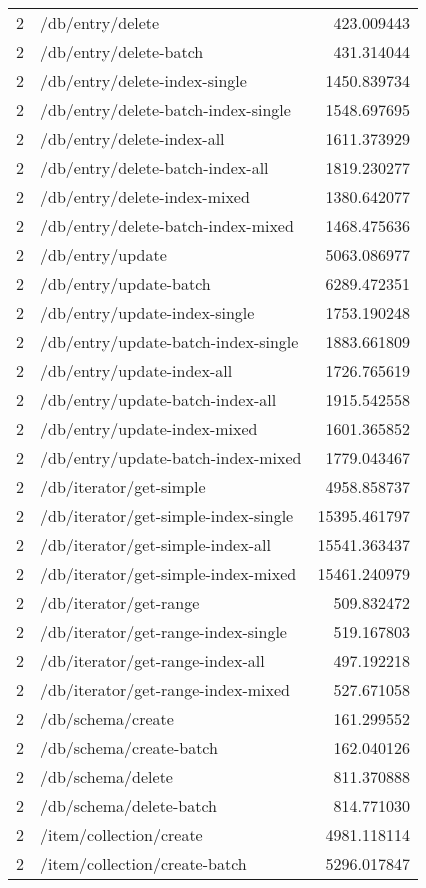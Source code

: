 \begin{longtable}{rlr}
2 & /db/entry/delete & 423.009443 \\
2 & /db/entry/delete-batch & 431.314044 \\
2 & /db/entry/delete-index-single & 1450.839734 \\
2 & /db/entry/delete-batch-index-single & 1548.697695 \\
2 & /db/entry/delete-index-all & 1611.373929 \\
2 & /db/entry/delete-batch-index-all & 1819.230277 \\
2 & /db/entry/delete-index-mixed & 1380.642077 \\
2 & /db/entry/delete-batch-index-mixed & 1468.475636 \\
2 & /db/entry/update & 5063.086977 \\
2 & /db/entry/update-batch & 6289.472351 \\
2 & /db/entry/update-index-single & 1753.190248 \\
2 & /db/entry/update-batch-index-single & 1883.661809 \\
2 & /db/entry/update-index-all & 1726.765619 \\
2 & /db/entry/update-batch-index-all & 1915.542558 \\
2 & /db/entry/update-index-mixed & 1601.365852 \\
2 & /db/entry/update-batch-index-mixed & 1779.043467 \\
2 & /db/iterator/get-simple & 4958.858737 \\
2 & /db/iterator/get-simple-index-single & 15395.461797 \\
2 & /db/iterator/get-simple-index-all & 15541.363437 \\
2 & /db/iterator/get-simple-index-mixed & 15461.240979 \\
2 & /db/iterator/get-range & 509.832472 \\
2 & /db/iterator/get-range-index-single & 519.167803 \\
2 & /db/iterator/get-range-index-all & 497.192218 \\
2 & /db/iterator/get-range-index-mixed & 527.671058 \\
2 & /db/schema/create & 161.299552 \\
2 & /db/schema/create-batch & 162.040126 \\
2 & /db/schema/delete & 811.370888 \\
2 & /db/schema/delete-batch & 814.771030 \\
2 & /item/collection/create & 4981.118114 \\
2 & /item/collection/create-batch & 5296.017847 \\

\end{longtable}
